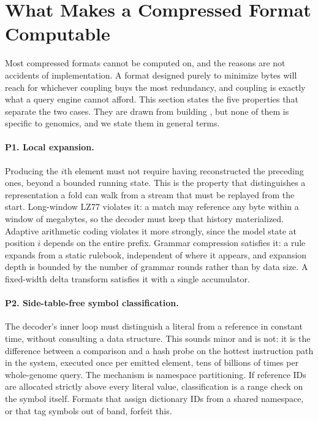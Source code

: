 \section{What Makes a Compressed Format Computable}
\label{sec:principles}

Most compressed formats cannot be computed on, and the reasons are not accidents
of implementation. A format designed purely to minimize bytes will reach for
whichever coupling buys the most redundancy, and coupling is exactly what a query
engine cannot afford. This section states the five properties that separate the
two cases. They are drawn from building \sys, but none of them is specific to
genomics, and we state them in general terms.

\paragraph{P1. Local expansion.}
Producing the $i$th element must not require having reconstructed the preceding
ones, beyond a bounded running state. This is the property that distinguishes a
representation a fold can walk from a stream that must be replayed from the start.
Long-window LZ77 violates it: a match may reference any byte within a window of
megabytes, so the decoder must keep that history materialized. Adaptive
arithmetic coding violates it more strongly, since the model state at position
$i$ depends on the entire prefix. Grammar compression satisfies it: a rule
expands from a static rulebook, independent of where it appears, and expansion
depth is bounded by the number of grammar rounds rather than by data size. A
fixed-width delta transform satisfies it with a single accumulator.

\paragraph{P2. Side-table-free symbol classification.}
The decoder's inner loop must distinguish a literal from a reference in constant
time, without consulting a data structure. This sounds minor and is not: it is
the difference between a comparison and a hash probe on the hottest instruction
path in the system, executed once per emitted element, tens of billions of times
per whole-genome query. The mechanism is namespace partitioning. If reference IDs
are allocated strictly above every literal value, classification is a range check
on the symbol itself. Formats that assign dictionary IDs from a shared namespace,
or that tag symbols out of band, forfeit this.

